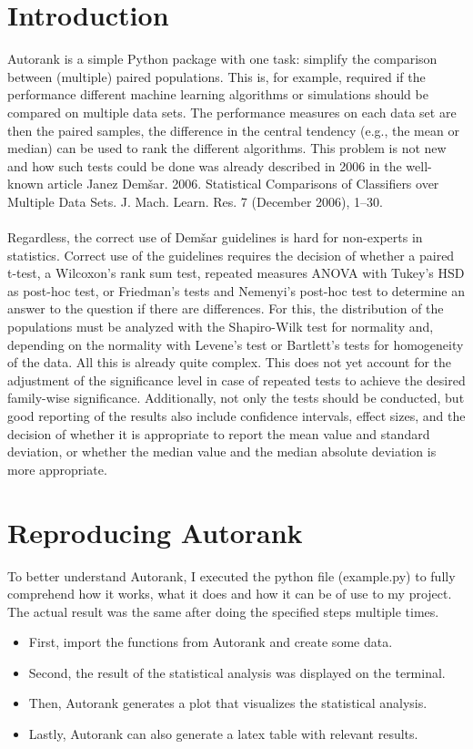 \documentclass[12pt]{article}
\begin{document}
\section{ Introduction}
Autorank is a simple Python package with one task: simplify the comparison between (multiple) paired populations. This is, for example, required if the performance different machine learning algorithms or simulations should be compared on multiple data sets. The performance measures on each data set are then the paired samples, the difference in the central tendency (e.g., the mean or median) can be used to rank the different algorithms. This problem is not new and how such tests could be done was already described in 2006 in the well-known article Janez Demšar. 2006. Statistical Comparisons of Classifiers over Multiple Data Sets. J. Mach. Learn. Res. 7 (December 2006), 1–30.\\\\
Regardless, the correct use of Demšar guidelines is hard for non-experts in statistics. Correct use of the guidelines requires the decision of whether a paired t-test, a Wilcoxon's rank sum test, repeated measures ANOVA with Tukey's HSD as post-hoc test, or Friedman's tests and Nemenyi's post-hoc test to determine an answer to the question if there are differences. For this, the distribution of the populations must be analyzed with the Shapiro-Wilk test for normality and, depending on the normality with Levene's test or Bartlett's tests for homogeneity of the data. All this is already quite complex. This does not yet account for the adjustment of the significance level in case of repeated tests to achieve the desired family-wise significance. Additionally, not only the tests should be conducted, but good reporting of the results also include confidence intervals, effect sizes, and the decision of whether it is appropriate to report the mean value and standard deviation, or whether the median value and the median absolute deviation is more appropriate.


\newpage
\section{Reproducing Autorank}
To better understand Autorank, I executed the python file (example.py) to fully comprehend how it works, what it does and how it can be of use to my project. The actual result was the same after doing the specified steps multiple times. 
\begin{itemize}

\item First, import the functions from Autorank and create some data.
\item Second, the result of the statistical analysis was displayed on the terminal.
\item Then, Autorank generates a plot that visualizes the statistical analysis. 
\item Lastly, Autorank can also generate a latex table with relevant results.

\end{itemize}
\end{document}
